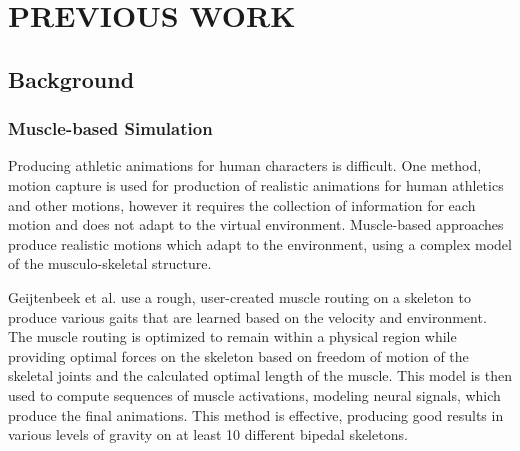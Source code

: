 
 
\chapter{PREVIOUS WORK}
\label{chapter:previous_work}

\section{Background}
\subsection{Muscle-based Simulation}
Producing athletic animations for human characters is difficult.  One method, motion capture is used for production of realistic animations for human athletics and other motions, however it requires the collection of information for each motion and does not adapt to the virtual environment.  Muscle-based approaches produce realistic motions which adapt to the environment, using a complex model of the musculo-skeletal structure.  

Geijtenbeek et al.\cite{muscle_based_bipeds} use a rough, user-created muscle routing on a skeleton to produce various gaits that are learned based on the velocity and environment.  The muscle routing is optimized to remain within a physical region while providing optimal forces on the skeleton based on freedom of motion of the skeletal joints and the calculated optimal length of the muscle.  This model is then used to compute sequences of muscle activations, modeling neural signals, which produce the final animations.  This method is effective, producing good results in various levels of gravity on at least 10 different bipedal skeletons.

		

